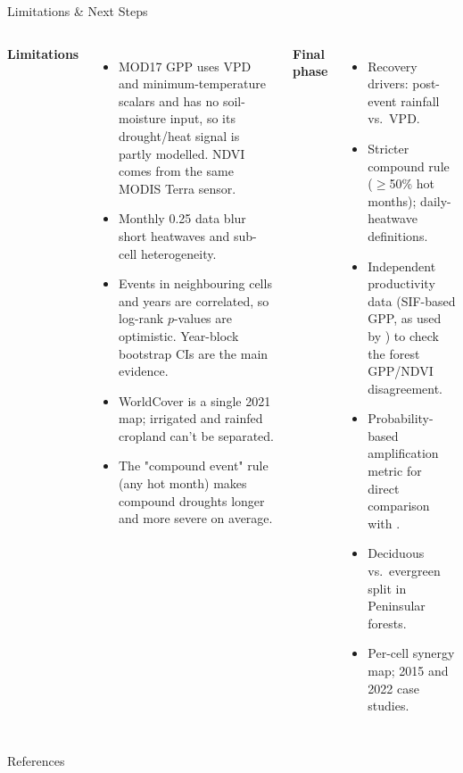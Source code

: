 \documentclass[12pt,aspectratio=169]{beamer}
\begin{document}
\begin{frame}{Limitations \& Next Steps}
  \scriptsize
  \begin{columns}[T]
    \textbf{Limitations}
    \begin{itemize}
      \item MOD17 GPP uses VPD and minimum-temperature scalars and has no
        soil-moisture input, so its drought/heat signal is partly modelled.
        NDVI comes from the same MODIS Terra sensor.
      \item Monthly 0.25\textdegree{} data blur short heatwaves and
        sub-cell heterogeneity.
      \item Events in neighbouring cells and years are correlated, so
        log-rank $p$-values are optimistic. Year-block bootstrap CIs are
        the main evidence.
      \item WorldCover is a single 2021 map; irrigated and rainfed cropland
        can't be separated.
      \item The "compound event" rule (any hot month) makes compound
        droughts longer and more severe on average.
    \end{itemize}
    \textbf{Final phase}
    \begin{itemize}
      \item Recovery drivers: post-event rainfall vs.\ VPD.
      \item Stricter compound rule ($\ge$50\% hot months); daily-heatwave
        definitions.
      \item Independent productivity data (SIF-based GPP, as used by
        \citealp{sen2026}) to check the forest GPP/NDVI disagreement.
      \item Probability-based amplification metric for direct comparison
        with \citet{meena2026}.
      \item Deciduous vs.\ evergreen split in Peninsular forests.
      \item Per-cell synergy map; 2015 and 2022 case studies.
    \end{itemize}
  \end{columns}
\end{frame}

\begin{frame}[allowframebreaks]{References}
  \footnotesize
  
\end{frame}
\end{document}
